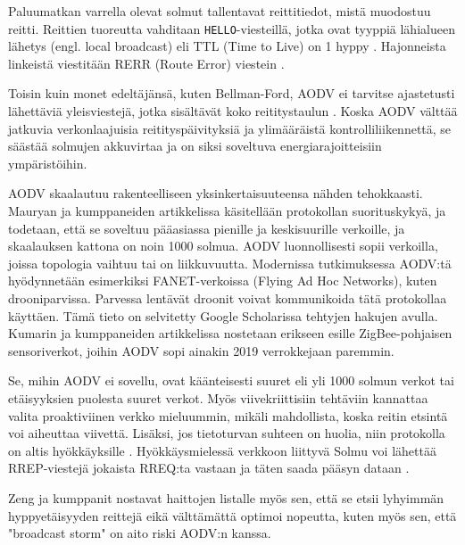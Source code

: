\documentclass[finnish,utf8,nonumbib,palatino]{KokkolaRaportti}
\begin{document}
Paluumatkan varrella olevat solmut tallentavat reittitiedot, mistä muodostuu reitti. Reittien tuoreutta vahditaan \texttt{HELLO}-viesteillä, jotka ovat tyyppiä lähialueen lähetys (engl. local broadcast) eli TTL (Time to Live) on 1 hyppy \cite{maurya-2012}. Hajonneista linkeistä viestitään RERR (Route Error) viestein \cite{maurya-2012}.

Toisin kuin monet edeltäjänsä, kuten Bellman-Ford, AODV ei tarvitse ajastetusti lähettäviä yleisviestejä, jotka sisältävät koko reititystaulun \cite{tanenbaum-2002}. Koska AODV välttää jatkuvia verkonlaajuisia reitityspäivityksiä ja ylimääräistä kontrolliliikennettä, se säästää solmujen akkuvirtaa ja on siksi soveltuva energiarajoitteisiin ympäristöihin. \cite{maurya-2012}

AODV skaalautuu rakenteelliseen yksinkertaisuuteensa nähden tehokkaasti. Mauryan ja kumppaneiden artikkelissa \cite{maurya-2012} käsitellään protokollan suorituskykyä, ja todetaan, että se soveltuu pääasiassa pienille ja keskisuurille verkoille, ja skaalauksen kattona on noin 1000 solmua. AODV luonnollisesti sopii verkoilla, joissa topologia vaihtuu tai on liikkuvuutta. Modernissa tutkimuksessa AODV:tä hyödynnetään esimerkiksi FANET-verkoissa (Flying Ad Hoc Networks), kuten drooniparvissa. Parvessa lentävät droonit voivat kommunikoida tätä protokollaa käyttäen. Tämä tieto on selvitetty Google Scholarissa tehtyjen hakujen avulla. Kumarin ja kumppaneiden artikkelissa \cite{kumar-2019} nostetaan erikseen esille ZigBee-pohjaisen sensoriverkot, joihin AODV sopi ainakin 2019 verrokkejaan paremmin.

Se, mihin AODV ei sovellu, ovat käänteisesti suuret eli yli 1000 solmun verkot tai etäisyyksien puolesta suuret verkot. Myös viivekriittisiin tehtäviin kannattaa valita proaktiviinen verkko mieluummin, mikäli mahdollista, koska reitin etsintä voi aiheuttaa viivettä. Lisäksi, jos tietoturvan suhteen on huolia, niin protokolla on altis hyökkäyksille \cite{maurya-2012} . Hyökkäysmielessä verkkoon liittyvä Solmu voi lähettää RREP-viestejä jokaista RREQ:ta vastaan ja täten saada pääsyn dataan \cite{security-2009}.

Zeng ja kumppanit \cite{wiley-2011} nostavat haittojen listalle myös sen, että se etsii lyhyimmän hyppyetäisyyden reittejä eikä välttämättä optimoi nopeutta, kuten myös sen, että "broadcast storm" on aito riski AODV:n kanssa.


\end{document}
